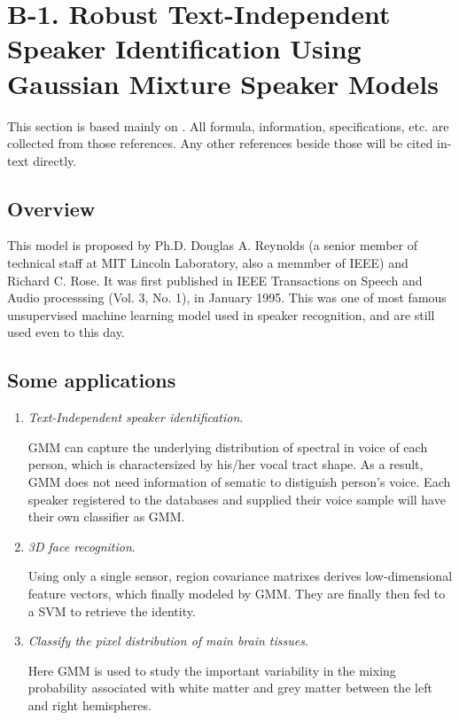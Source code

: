 \section*{B-1. Robust Text-Independent Speaker Identification Using Gaussian Mixture Speaker Models}

This section is based mainly on \cite{Reynolds1995}. All formula, information, specifications, etc. are collected from those references. Any other references beside those will be cited in-text directly.

\subsection*{Overview}

This model is proposed by Ph.D. Douglas A. Reynolds (a senior member of technical staff at MIT Lincoln Laboratory, also a memmber of IEEE) and Richard C. Rose. It was first published in IEEE Transactions on Speech and Audio processsing (Vol. 3, No. 1), in January 1995. This was one of most famous unsupervised machine learning model used in speaker recognition, and are still used even to this day.

\subsection*{Some applications}

\begin{enumerate}
	
	\item \emph{Text-Independent speaker identification}.
	
	 GMM can capture the underlying distribution of spectral in voice of each person, which is charactersized by his/her vocal tract shape. As a result, GMM does not need information of sematic to distiguish person's voice. Each speaker registered to the databases and supplied their voice sample will have their own classifier as GMM. 
	\item \emph{3D face recognition}. 
	
	Using only a single sensor, region covariance matrixes derives low-dimensional feature vectors, which finally modeled by GMM. They are finally then fed to a SVM to retrieve the identity.
	
	\item \emph{Classify the pixel distribution of main brain tissues}. 
	
	Here GMM is used to study the important variability in the mixing probability associated with white matter and grey matter between the left and right hemispheres.

\end{enumerate}

